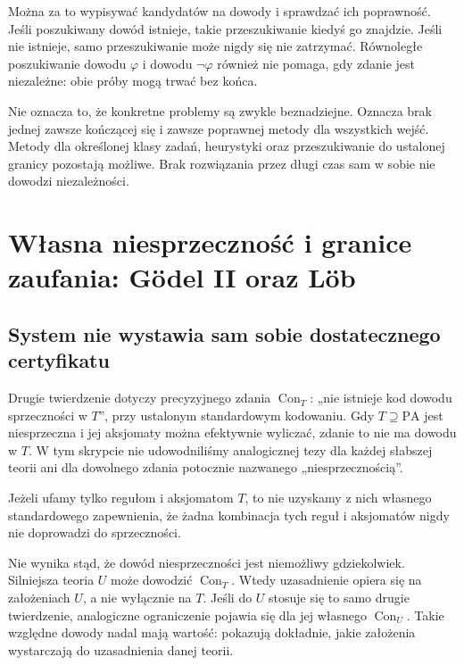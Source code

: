 \documentclass[11pt,a4paper]{article}
\numberwithin{equation}{section}
\theoremstyle{plain}
\theoremstyle{definition}
\theoremstyle{remark}
\begin{document}
Można za to wypisywać kandydatów na dowody i sprawdzać ich poprawność. Jeśli poszukiwany dowód istnieje, takie przeszukiwanie kiedyś go znajdzie. Jeśli nie istnieje, samo przeszukiwanie może nigdy się nie zatrzymać. Równoległe poszukiwanie dowodu $\varphi$ i dowodu $\neg\varphi$ również nie pomaga, gdy zdanie jest niezależne: obie próby mogą trwać bez końca.

Nie oznacza to, że konkretne problemy są zwykle beznadziejne. Oznacza brak jednej zawsze kończącej się i zawsze poprawnej metody dla wszystkich wejść. Metody dla określonej klasy zadań, heurystyki oraz przeszukiwanie do ustalonej granicy pozostają możliwe. Brak rozwiązania przez długi czas sam w sobie nie dowodzi niezależności.

\section{Własna niesprzeczność i granice zaufania: Gödel II oraz Löb}\label{sec:granice-zaufania}
\subsection*{System nie wystawia sam sobie dostatecznego certyfikatu}\label{sec:17:1}
Drugie twierdzenie dotyczy precyzyjnego zdania $\operatorname{Con}_T$: „nie istnieje kod dowodu sprzeczności w $T$”, przy ustalonym standardowym kodowaniu. Gdy $T\supseteq\mathrm{PA}$ jest niesprzeczna i jej aksjomaty można efektywnie wyliczać, zdanie to nie ma dowodu w $T$. W tym skrypcie nie udowodniliśmy analogicznej tezy dla każdej słabszej teorii ani dla dowolnego zdania potocznie nazwanego „niesprzecznością”.

Jeżeli ufamy tylko regułom i aksjomatom $T$, to nie uzyskamy z nich własnego standardowego zapewnienia, że żadna kombinacja tych reguł i aksjomatów nigdy nie doprowadzi do sprzeczności.

Nie wynika stąd, że dowód niesprzeczności jest niemożliwy gdziekolwiek. Silniejsza teoria $U$ może dowodzić $\operatorname{Con}_T$. Wtedy uzasadnienie opiera się na założeniach $U$, a nie wyłącznie na $T$. Jeśli do $U$ stosuje się to samo drugie twierdzenie, analogiczne ograniczenie pojawia się dla jej własnego $\operatorname{Con}_U$. Takie względne dowody nadal mają wartość: pokazują dokładnie, jakie założenia wystarczają do uzasadnienia danej teorii.
\end{document}
